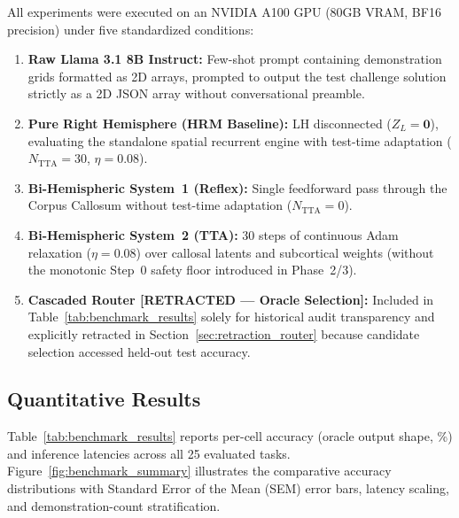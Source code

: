 \documentclass[11pt,a4paper]{article}
\theoremstyle{plain}
\theoremstyle{definition}
\theoremstyle{remark}
\begin{document}
All experiments were executed on an NVIDIA A100 GPU (80GB VRAM, BF16 precision) under five standardized conditions:
\begin{enumerate}
    \item \textbf{Raw Llama 3.1 8B Instruct:} Few-shot prompt containing demonstration grids formatted as 2D arrays, prompted to output the test challenge solution strictly as a 2D JSON array without conversational preamble.
    \item \textbf{Pure Right Hemisphere (HRM Baseline):} LH disconnected ($Z_L = \mathbf{0}$), evaluating the standalone spatial recurrent engine with test-time adaptation ($N_{\mathrm{TTA}} = 30$, $\eta = 0.08$).
    \item \textbf{Bi-Hemispheric System~1 (Reflex):} Single feedforward pass through the Corpus Callosum without test-time adaptation ($N_{\mathrm{TTA}} = 0$).
    \item \textbf{Bi-Hemispheric System~2 (TTA):} 30 steps of continuous Adam relaxation ($\eta = 0.08$) over callosal latents and subcortical weights (without the monotonic Step~0 safety floor introduced in Phase~2/3).
    \item \textbf{Cascaded Router [RETRACTED --- Oracle Selection]:} Included in Table~\ref{tab:benchmark_results} solely for historical audit transparency and explicitly retracted in Section~\ref{sec:retraction_router} because candidate selection accessed held-out test accuracy.
\end{enumerate}

\subsection{Quantitative Results}

Table~\ref{tab:benchmark_results} reports per-cell accuracy (oracle output shape, \%) and inference latencies across all 25 evaluated tasks. Figure~\ref{fig:benchmark_summary} illustrates the comparative accuracy distributions with Standard Error of the Mean (SEM) error bars, latency scaling, and demonstration-count stratification.
\end{document}
